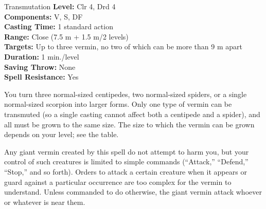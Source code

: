 {Transmutation}
{
	\textbf{Level:}
	Clr 4, Drd 4\\
	\textbf{Components:}
	V, S, DF\\
	\textbf{Casting Time:}
	1 standard action\\
	\textbf{Range:}
	Close (7.5 m + 1.5 m/2 levels)\\
	\textbf{Targets:}
	Up to three vermin, no two of which can be more than 9 m apart\\
	\textbf{Duration:}
	1 min./level\\
	\textbf{Saving Throw:}
	None\\
	\textbf{Spell Resistance:}
	Yes\\
}
{

	You turn three normal-sized centipedes, two normal-sized spiders, or a single normal-sized scorpion into larger forms. Only one type of vermin can be transmuted (so a single casting cannot affect both a centipede and a spider), and all must be grown to the same size. The size to which the vermin can be grown depends on your level; see the table.

	Any giant vermin created by this spell do not attempt to harm you, but your control of such creatures is limited to simple commands (``Attack,'' ``Defend,'' ``Stop,'' and so forth). Orders to attack a certain creature when it appears or guard against a particular occurrence are too complex for the vermin to understand. Unless commanded to do otherwise, the giant vermin attack whoever or whatever is near them.

}
